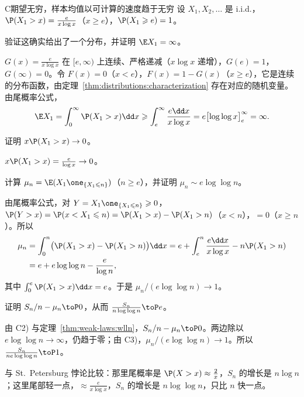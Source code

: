 \begin{probleme}{C}{期望无穷，样本均值以可计算的速度趋于无穷}
设 $X_1,X_2,\dots$ 是 i.i.d.，$\P(X_1>x)=\frac e{x\log x}$（$x\geqslant e$），$\P(X_1\geqslant e)=1$。
\begin{questions}
\item 验证这确实给出了一个分布，并证明 $\E X_1=\infty$。
\begin{solution}
$G(x)=\frac e{x\log x}$ 在 $[e,\infty)$ 上连续、严格递减（$x\log x$ 递增），$G(e)=1$，$G(\infty)=0$。令 $F(x)=0$（$x<e$），$F(x)=1-G(x)$（$x\geqslant e$），它是连续的分布函数，由定理~\ref{thm:distributions:characterization} 存在对应的随机变量。由尾概率公式，
\[
\E X_1=\int_0^\infty \P(X_1>x)\dd x\geqslant\int_e^\infty\frac{e\dd x}{x\log x}=e\bigl[\log\log x\bigr]_e^\infty=\infty .
\]
\end{solution}
\item 证明 $x\P(X_1>x)\to0$。
\begin{solution}
$x\P(X_1>x)=\frac e{\log x}\to0$。
\end{solution}
\item 计算 $\mu_n=\E(X_1\one_{\{X_1\leqslant n\}})$（$n\geqslant e$），并证明 $\mu_n\sim e\log\log n$。
\begin{solution}
由尾概率公式，对 $Y=X_1\one_{\{X_1\leqslant n\}}\geqslant0$，$\P(Y>x)=\P(x<X_1\leqslant n)=\P(X_1>x)-\P(X_1>n)$（$x<n$），$=0$（$x\geqslant n$）。所以
\[
\begin{aligned}
\mu_n&=\int_0^n\bigl(\P(X_1>x)-\P(X_1>n)\bigr)\dd x=e+\int_e^n\frac{e\dd x}{x\log x}-n\P(X_1>n)\\
&=e+e\log\log n-\frac e{\log n},
\end{aligned}
\]
其中 $\int_0^e\P(X_1>x)\dd x=e$。于是 $\mu_n/(e\log\log n)\to1$。
\end{solution}
\item 证明 $S_n/n-\mu_n\toP0$，从而 $\frac{S_n}{n\log\log n}\toP e$。
\begin{solution}
由 C2) 与定理~\ref{thm:weak-laws:wlln}，$S_n/n-\mu_n\toP0$。两边除以 $e\log\log n\to\infty$，仍趋于零；由 C3)，$\mu_n/(e\log\log n)\to1$。所以 $\frac{S_n}{ne\log\log n}\toP1$。

与 St.\ Petersburg 悖论比较：那里尾概率是 $\P(X>x)\approx\frac2x$，$S_n$ 的增长是 $n\log n$；这里尾部轻一点，$\approx\frac e{x\log x}$，$S_n$ 的增长是 $n\log\log n$，只比 $n$ 快一点。
\end{solution}
\end{questions}
\end{probleme}

